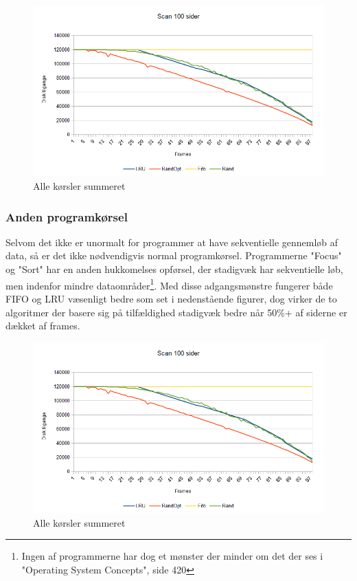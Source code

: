 \begin{figure}[ht]
\centerline{\includegraphics[scale=1]{graph/stat_scan}}
\FloatBarrier
\caption{Alle kørsler summeret}
\label{fig:scan}
\end{figure}

\subsubsection{Anden programkørsel}
Selvom det ikke er unormalt for programmer at have sekventielle gennemløb af data, så er det ikke nødvendigvis normal programkørsel. Programmerne "Focus" og "Sort" har en anden hukkomelses opførsel, der stadigvæk har sekventielle løb, men indenfor mindre dataområder\footnote{Ingen af programmerne har dog et mønster der minder om det der ses i "Operating System Concepts", side 420}. Med disse adgangsmønstre fungerer både FIFO og LRU væsenligt bedre som set i nedenstående figurer, dog virker de to algoritmer der basere sig på tilfældighed stadigvæk bedre når 50\%+ af siderne er dækket af frames. 

\begin{figure}[ht]
\centerline{\includegraphics[scale=1]{graph/stat_scan}}
\FloatBarrier
\caption{Alle kørsler summeret}
\label{fig:focus}
\end{figure}

